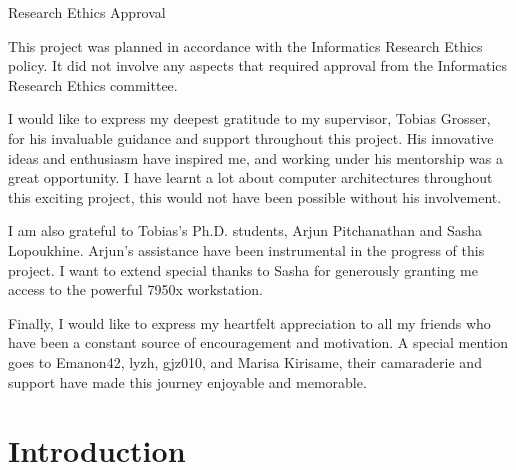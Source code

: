 \documentclass[logo,bsc,singlespacing,parskip]{infthesis}
\begin{document}
\begin{preliminary}
{%

}

\maketitle

\newenvironment{ethics}
   {\begin{frontenv}{Research Ethics Approval}{\LARGE}}
   {\end{frontenv}\newpage}

\begin{ethics}

This project was planned in accordance with the Informatics Research
Ethics policy. It did not involve any aspects that required approval
from the Informatics Research Ethics committee.

\standarddeclaration
\end{ethics}


\begin{acknowledgements}
    I would like to express my deepest gratitude to my supervisor, Tobias Grosser,
    for his invaluable guidance and support throughout this project. His
    innovative ideas and enthusiasm have inspired me, and working under his
    mentorship was a great opportunity. I have learnt a lot about computer
    architectures throughout this exciting project, this would not have been
    possible without his involvement.

    I am also grateful to Tobias's Ph.D. students, Arjun Pitchanathan
    and Sasha Lopoukhine. Arjun's assistance have been instrumental
    in the progress of this project. I want to extend special thanks to
    Sasha for generously granting me access to the powerful 7950x workstation.
    
    Finally, I would like to express my heartfelt appreciation to all my friends
    who have been a constant source of encouragement and motivation. A special
    mention goes to Emanon42, lyzh, gjz010, and Marisa Kirisame, their
    camaraderie and support have made this journey enjoyable and memorable.

\end{acknowledgements}


\tableofcontents
\end{preliminary}


\chapter{Introduction}
\label{sec:introduction}
\end{document}
